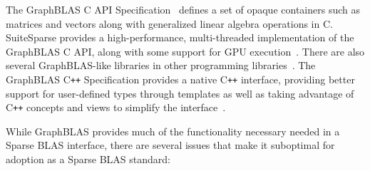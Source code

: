 \documentclass{article}
\newcommand{\cplusplus}{C\texttt{++}\xspace}
\begin{document}
The GraphBLAS C API Specification~\cite{brock2021graphblas} defines a
set of opaque containers such as matrices and vectors along with
generalized linear algebra operations in C.  SuiteSparse provides a
high-performance, multi-threaded implementation of the GraphBLAS C API,
along with some support for GPU
execution~\cite{davis2019algorithm,davis2023algorithm}. There are also
several GraphBLAS-like libraries in other programming
libraries~\cite{erik_welch_2024_10631255, yzelman2020c++,
yang2022graphblast}.  The GraphBLAS \cplusplus Specification provides
a native \cplusplus interface, providing better support for
user-defined types through templates as well as taking advantage of
\cplusplus concepts and views to simplify the
interface~\cite{9150467,graphblascppspec}.

While GraphBLAS provides much of the functionality necessary needed in a Sparse
BLAS interface, there are several issues that make it suboptimal for adoption
as a Sparse BLAS standard:
\end{document}
